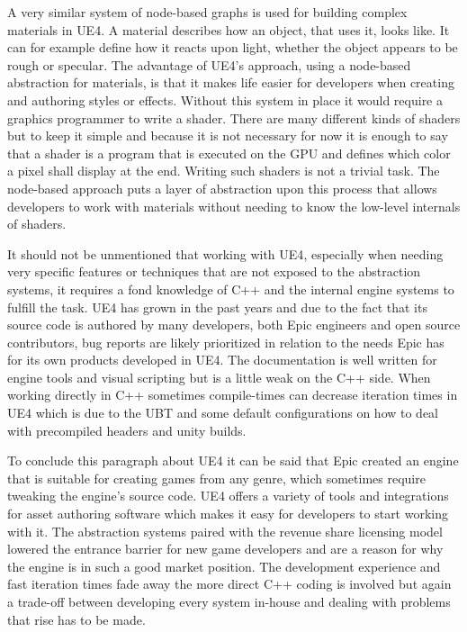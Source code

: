 A very similar system of node-based graphs is used for building complex materials in \ac{UE4}. A material describes how an object, that uses it, looks like. It can for example define how it reacts upon light, whether the object appears to be rough or specular. The advantage of \ac{UE4}'s approach, using a node-based abstraction for materials, is that it makes life easier for developers when creating and authoring styles or effects. Without this system in place it would require a graphics programmer to write a shader. There are many different kinds of shaders but to keep it simple and because it is not necessary for now it is enough to say that a shader is a program that is executed on the \ac{GPU} and defines which color a pixel shall display at the end. Writing such shaders is not a trivial task. The node-based approach puts a layer of abstraction upon this process that allows developers to work with materials without needing to know the low-level internals of shaders.

It should not be unmentioned that working with \ac{UE4}, especially when needing very specific features or techniques that are not exposed to the abstraction systems, it requires a fond knowledge of C++ and the internal engine systems to fulfill the task. \ac{UE4} has grown in the past years and due to the fact that its source code is authored by many developers, both Epic engineers and open source contributors, bug reports are likely prioritized in relation to the needs Epic has for its own products developed in \ac{UE4}. The documentation is well written for engine tools and visual scripting but is a little weak on the C++ side. When working directly in C++ sometimes compile-times can decrease iteration times in \ac{UE4} which is due to the \ac{UBT} and some default configurations on how to deal with precompiled headers and unity builds.

To conclude this paragraph about \ac{UE4} it can be said that Epic created an engine that is suitable for creating games from any genre, which sometimes require tweaking the engine's source code. \ac{UE4} offers a variety of tools and integrations for asset authoring software which makes it easy for developers to start working with it. The abstraction systems paired with the revenue share licensing model lowered the entrance barrier for new game developers and are a reason for why the engine is in such a good market position. The development experience and fast iteration times fade away the more direct C++ coding is involved but again a trade-off between developing every system in-house and dealing with problems that rise has to be made.

